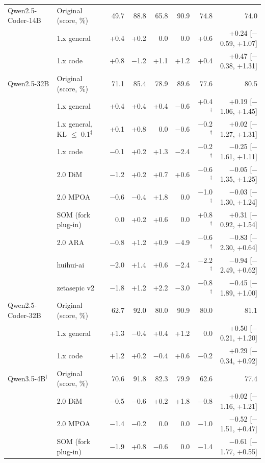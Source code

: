 \begin{tabular}{@{}llrrrrrr@{}}
Qwen2.5-Coder-14B & Original (score, \%) & 49.7 & 88.8 & 65.8 & 90.9 & 74.8 & 74.0 \\
 & 1.x general & +0.4 & +0.2 & 0.0 & 0.0 & +0.6 & +0.24 [$-$0.59, +1.07] \\
 & 1.x code & +0.8 & $-$1.2 & +1.1 & +1.2 & +0.4 & +0.47 [$-$0.38, +1.31] \\
\addlinespace[2pt]
Qwen2.5-32B & Original (score, \%) & 71.1 & 85.4 & 78.9 & 89.6 & 77.6 & 80.5 \\
 & 1.x general & +0.4 & +0.4 & +0.4 & $-$0.6 & +0.4$^{\dagger}$ & +0.19 [$-$1.06, +1.45] \\
 & 1.x general, KL $\le$ 0.1$^{\ddagger}$ & +0.1 & +0.8 & 0.0 & $-$0.6 & $-$0.2$^{\dagger}$ & +0.02 [$-$1.27, +1.31] \\
 & 1.x code & $-$0.1 & +0.2 & +1.3 & $-$2.4 & $-$0.2$^{\dagger}$ & $-$0.25 [$-$1.61, +1.11] \\
 & 2.0 DiM & $-$1.2 & +0.2 & +0.7 & +0.6 & $-$0.6$^{\dagger}$ & $-$0.05 [$-$1.35, +1.25] \\
 & 2.0 MPOA & $-$0.6 & $-$0.4 & +1.8 & 0.0 & $-$1.0$^{\dagger}$ & $-$0.03 [$-$1.30, +1.24] \\
 & SOM (fork plug-in) & 0.0 & +0.2 & +0.6 & 0.0 & +0.8$^{\dagger}$ & +0.31 [$-$0.92, +1.54] \\
 & 2.0 ARA & $-$0.8 & +1.2 & +0.9 & $-$4.9 & $-$0.6$^{\dagger}$ & $-$0.83 [$-$2.30, +0.64] \\
 & huihui-ai & $-$2.0 & +1.4 & +0.6 & $-$2.4 & $-$2.2$^{\dagger}$ & $-$0.94 [$-$2.49, +0.62] \\
 & zetasepic v2 & $-$1.8 & +1.2 & +2.2 & $-$3.0 & $-$0.8$^{\dagger}$ & $-$0.45 [$-$1.89, +1.00] \\
\addlinespace[2pt]
Qwen2.5-Coder-32B & Original (score, \%) & 62.7 & 92.0 & 80.0 & 90.9 & 80.0 & 81.1 \\
 & 1.x general & +1.3 & $-$0.4 & +0.4 & +1.2 & 0.0 & +0.50 [$-$0.21, +1.20] \\
 & 1.x code & +1.2 & +0.2 & $-$0.4 & +0.6 & $-$0.2 & +0.29 [$-$0.34, +0.92] \\
\addlinespace[2pt]
Qwen3.5-4B$^{\ddagger}$ & Original (score, \%) & 70.6 & 91.8 & 82.3 & 79.9 & 62.6 & 77.4 \\
 & 2.0 DiM & $-$0.5 & $-$0.6 & +0.2 & +1.8 & $-$0.8 & +0.02 [$-$1.16, +1.21] \\
 & 2.0 MPOA & $-$1.4 & $-$0.2 & 0.0 & 0.0 & $-$1.0 & $-$0.52 [$-$1.51, +0.47] \\
 & SOM (fork plug-in) & $-$1.9 & +0.8 & $-$0.6 & 0.0 & $-$1.4 & $-$0.61 [$-$1.77, +0.55] \\

\end{tabular}
